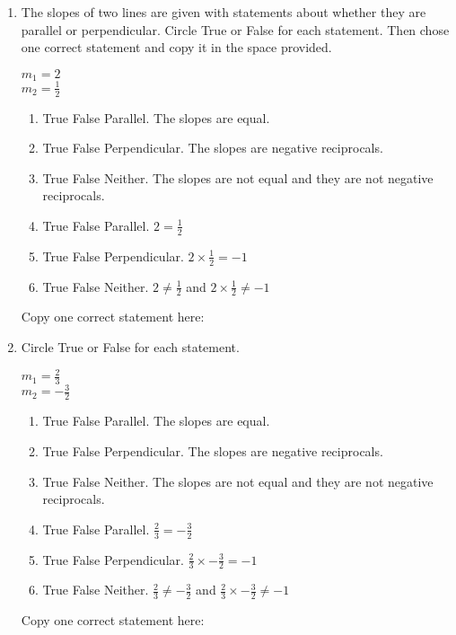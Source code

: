 \documentclass[12pt, twoside]{article}
\begin{document}
\begin{enumerate}
\newpage
\item The slopes of two lines are given with statements about whether they are parallel or perpendicular. Circle True or False for each statement. Then chose one correct statement and copy it in the space provided.
  \begin{multicols}{2}
    $\displaystyle m_1=2$ \\
    $\displaystyle m_2=\frac{1}{2}$
  \end{multicols}
    \begin{enumerate}[leftmargin=!,labelindent=-0.5cm,itemindent=-2.9cm,itemsep=0.25cm]
      \item True \quad False \quad Parallel. The slopes are equal.
      \item True \quad False \quad Perpendicular. The slopes are  negative reciprocals.
      \item True \quad False \quad Neither. The slopes are not equal and they are not negative reciprocals.
      \item True \quad False \quad Parallel. $\displaystyle 2= \frac{1}{2}$
      \item True \quad False \quad Perpendicular. $\displaystyle 2 \times \frac{1}{2}= -1$
      \item True \quad False \quad Neither. $\displaystyle 2 \neq \frac{1}{2}$ and $\displaystyle 2 \times \frac{1}{2} \neq -1$
    \end{enumerate}
    Copy one correct statement here: \vspace{2cm}
\item Circle True or False for each statement.
  \begin{multicols}{2}
    $\displaystyle m_1=\frac{2}{3}$ \\
    $\displaystyle m_2=-\frac{3}{2}$
  \end{multicols}
    \begin{enumerate}[leftmargin=!,labelindent=-0.5cm,itemindent=-2.9cm,itemsep=0.25cm]
      \item True \quad False \quad Parallel. The slopes are equal.
      \item True \quad False \quad Perpendicular. The slopes are  negative reciprocals.
      \item True \quad False \quad Neither. The slopes are not equal and they are not negative reciprocals.
      \item True \quad False \quad Parallel. $\displaystyle \frac{2}{3}=-\frac{3}{2}$
      \item True \quad False \quad Perpendicular. $\displaystyle \frac{2}{3} \times -\frac{3}{2}= -1$
      \item True \quad False \quad Neither. $\displaystyle \frac{2}{3} \neq -\frac{3}{2}$ and $\displaystyle \frac{2}{3} \times -\frac{3}{2} \neq -1$
    \end{enumerate}
    Copy one correct statement here:


\end{enumerate}
\end{document}
